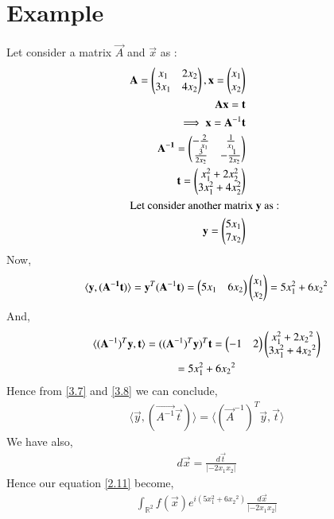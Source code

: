 \documentclass[journal,12pt,twocolumn]{IEEEtran}
\numberwithin{table}{section}
\begin{document}
\section{Example}
Let consider a matrix $\vec{A}$ and $\vec{x}$ as :
\begin{align}
\mathbf{A} = \begin{pmatrix}x_1 & 2x_2 \\ 3x_1  & 4x_2\end{pmatrix}, \mathbf{x} = \begin{pmatrix}x_1 \\x_2\end{pmatrix}\\
\mathbf{A}\mathbf{x} = \mathbf{t}\\
\implies \mathbf{x} = \mathbf{A}^{-1}\mathbf{t}\\
\mathbf{A^{-1}} =\begin{pmatrix}-\frac{2}{x_1} & \frac{1}{x_1} \\ \frac{3}{2x_2} & -\frac{1}{2x_2}\end{pmatrix}\\
\mathbf{t} = \begin{pmatrix}x_1^2 + 2x_2^2 \\ 3x_1^2 + 4x_2^2\end{pmatrix}\\
\intertext{Let consider another matrix $\mathbf{y}$ as : }
\mathbf{y} = \begin{pmatrix}5x_1 \\7x_2\end{pmatrix}
\end{align}
Now,
\begin{multline}
\langle \mathbf{y},(\mathbf{A^{-1}}\mathbf{t}) \rangle =\mathbf{y}^T(\mathbf{A}^{-1}\mathbf{t}) = \begin{pmatrix}5x_1 & 6{x_2}\end{pmatrix}\begin{pmatrix}x_1 \\ x_2\end{pmatrix}  = 5x_1^2 + 6{x_2}^2 \label{3.7}
\end{multline}
And,
\begin{multline}
\langle   (\mathbf{A}^{-1})^T\mathbf{y}, \mathbf{t} \rangle = ((\mathbf{A}^{-1})^T\mathbf{y})^T \mathbf{t} = \begin{pmatrix}-1 & 2\end{pmatrix}\begin{pmatrix}x_1^2 +2{x_2}^2 \\3x_1^2 +4{x_2}^2\end{pmatrix}\\ = 5x_1^2 + 6{x_2}^2 \label{3.8}
\end{multline}
Hence from \eqref{3.7} and \eqref{3.8} we can conclude,
\begin{align}
 \langle \vec{y},(\vec{A^{-1}}\vec{t}) \rangle = \langle (\vec{A}^{-1})^T\vec{y}, \vec{t} \rangle
\end{align}
 We have also, 
 \begin{align}
 d\vec{x} = \frac{d\vec{t}}{  \left | -2x_1x_2 \right|}
 \end{align}
 Hence our equation \eqref{2.11} become,
 \begin{align}
 \int_{\mathbb{R}^2} f(\vec{x}) e^{i(5x_1^2 + 6{x_2}^2)}\frac{d\vec{x}}{  \left | -2x_1x_2 \right|}
 \end{align}

 
\end{document}
